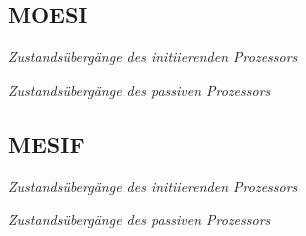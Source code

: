 \subsection{MOESI}
\begin{minipage}{\linewidth}
\centering

{\small\textit{Zustandsübergänge des initiierenden Prozessors}}

{\small\textit{Zustandsübergänge des passiven Prozessors}}
\end{minipage}

\subsection{MESIF}
\begin{minipage}{\linewidth}
\centering

{\small\textit{Zustandsübergänge des initiierenden Prozessors}}

{\small\textit{Zustandsübergänge des passiven Prozessors}}
\end{minipage}


